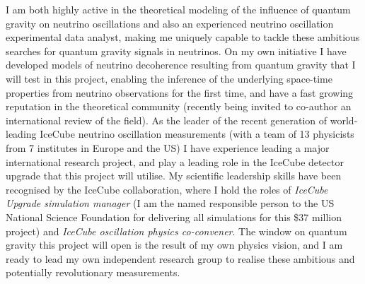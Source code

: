 \documentclass[a4paper,11pt]{article}
\newcounter{bar}
\begin{document}
I am both highly active in the theoretical modeling of the influence of quantum gravity on neutrino oscillations and also an experienced neutrino oscillation experimental data analyst, making me uniquely capable to tackle these ambitious searches for quantum gravity signals in neutrinos. On my own initiative I have developed models of neutrino decoherence resulting from quantum gravity that I will test in this project, enabling the inference of the underlying space-time properties from neutrino observations for the first time, and have a fast growing reputation in the theoretical community (recently being invited to co-author an international review of the field). As the leader of the recent generation of world-leading IceCube neutrino oscillation measurements (with a team of 13 physicists from 7 institutes in Europe and the US) I have experience leading a major international research project, and play a leading role in the IceCube detector upgrade that this project will utilise. My scientific leadership skills have been recognised by the IceCube collaboration, where I hold the roles of \textit{IceCube Upgrade simulation manager} (I am the named responsible person to the US National Science Foundation for delivering all simulations for this \$37 million project) and \textit{IceCube oscillation physics co-convener}. The window on quantum gravity this project will open is the result of my own physics vision, and I am ready to lead my own independent research group to realise these ambitious and potentially revolutionary measurements. \\



\end{document}

